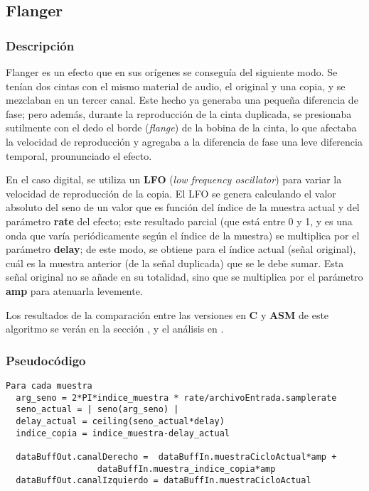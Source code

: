 \subsection{Flanger}
\label{subsec:desarrollo-flanger}

\subsubsection{Descripción}
\label{subsec:desarrollo-flanger-desc}

Flanger es un efecto que en sus orígenes se conseguía del siguiente modo. Se tenían dos cintas con el mismo material de audio, el original y una copia, y se mezclaban en un tercer canal. Este hecho ya generaba una pequeña diferencia de fase; pero además, durante la reproducción de la cinta duplicada, se presionaba sutilmente con el dedo el borde (\textit{flange}) de la bobina de la cinta, lo que afectaba la velocidad de reproducción y agregaba a la diferencia de fase una leve diferencia temporal, proununciado el efecto.

En el caso digital, se utiliza un \textbf{LFO} (\textit{low frequency oscillator}) para variar la velocidad de reproducción de la copia. El LFO se genera calculando el valor absoluto del seno de un valor que es función del índice de la muestra actual y del parámetro \textbf{rate} del efecto; este resultado parcial (que está entre 0 y 1, y es una onda que varía periódicamente según el índice de la muestra) se multiplica por el parámetro  \textbf{delay}; de este modo, se obtiene para el índice actual (señal original), cuál es la muestra anterior (de la señal duplicada) que se le debe sumar. Esta señal original no se añade en su totalidad, sino que se multiplica por el parámetro \textbf{amp} para atenuarla levemente.

\vspace{\baselineskip}

Los resultados de la comparación entre las versiones en \textbf{C} y \textbf{ASM} de este algoritmo se verán en la sección , y el análisis en .

\subsubsection{Pseudocódigo}
\label{subsec:desarrollo-flanger-code}

\lstset{language=C}
\begin{lstlisting}[frame=single]
Para cada muestra
  arg_seno = 2*PI*indice_muestra * rate/archivoEntrada.samplerate
  seno_actual = | seno(arg_seno) |
  delay_actual = ceiling(seno_actual*delay)
  indice_copia = indice_muestra-delay_actual
  
  dataBuffOut.canalDerecho =  dataBuffIn.muestraCicloActual*amp + 
			      dataBuffIn.muestra_indice_copia*amp
  dataBuffOut.canalIzquierdo = dataBuffIn.muestraCicloActual
\end{lstlisting}

